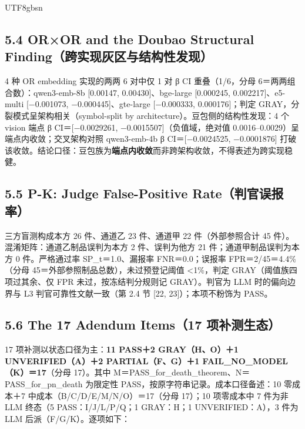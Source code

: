 \documentclass[10pt,a4paper]{article}
\begin{document}
\begin{CJK}{UTF8}{gbsn}
\subsection*{5.4 OR×OR and the Doubao Structural Finding（跨实现灰区与结构性发现）}4 种 OR embedding 实现的两两 6 对中仅 1 对 β CI 重叠（1/6，分母 6＝两两组合数）：qwen3-emb-8b [0.00147, 0.00430]、bge-large [0.000245, 0.002217]、e5-multi [−0.001073, −0.000445]、gte-large [−0.000333, 0.000176]；判定 GRAY，分裂模式呈架构相关（symbol-split by architecture）。豆包侧的结构性发现：4 个 vision 端点 β CI＝[−0.0029261, −0.0015507]（负值域，绝对值 0.0016–0.0029）呈端点内收敛；交叉架构对照 qwen3-emb-4b β CI＝[−0.0024525, −0.0001876] 打破该收敛。结论口径：豆包族为\textbf{端点内收敛}而非跨架构收敛，不得表述为跨实现稳健。

\subsection*{5.5 P-K: Judge False-Positive Rate（判官误报率）}三方盲测构成本方 26 件、通道乙 23 件、通道甲 22 件（外部参照合计 45 件）。混淆矩阵：通道乙制品误判为本方 2 件、误判为他方 21 件；通道甲制品误判为本方 0 件。严格通过率 SP\_t＝1.0、漏报率 FNR＝0.0；误报率 FPR＝2/45＝4.4\%（分母 45＝外部参照制品总数），未过预登记阈值 <1\%，判定 GRAY（阈值族四项过其余、仅 FPR 未过，按冻结判分规则记 GRAY）。判官为 LLM 时的偏向边界与 L3 判官可靠性文献一致（第 2.4 节 [22, 23]）；本项不粉饰为 PASS。

\subsection*{5.6 The 17 Adendum Items（17 项补测生态）}17 项补测以状态口径为主：\textbf{11 PASS＋2 GRAY（H、O）＋1 UNVERIFIED（A）＋2 PARTIAL（F、G）＋1 FAIL\_NO\_MODEL（K）＝17}（分母 17）。其中 M＝PASS\_for\_death\_theorem、N＝PASS\_for\_pn\_death 为限定性 PASS，按原字符串记录。成本口径备述：10 零成本＋7 中成本（B/C/D/E/M/N/O）＝17（分母 17）；10 项零成本中 7 件为非 LLM 终态（5 PASS：I/J/L/P/Q；1 GRAY：H；1 UNVERIFIED：A），3 件为 LLM 后派（F/G/K）。逐项如下：



\end{CJK}
\end{document}
